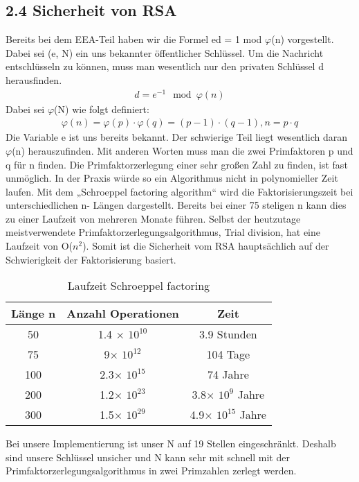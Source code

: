 \documentclass[course=asp]{aspdoc}
\begin{document}
\subsection*{2.4 Sicherheit von RSA}
Bereits bei dem EEA-Teil haben wir die Formel ed = 1 mod $\varphi $(n) vorgestellt.  Dabei sei (e, N) ein uns bekannter öffentlicher Schlüssel. Um die Nachricht entschlüsseln zu können, muss man wesentlich nur den privaten Schlüssel d herausfinden. 
\begin{align}
	d = e^{-1} \mod \varphi (n)
\end{align}
Dabei sei $\varphi $(N) wie folgt definiert:
\begin{align}
	\varphi (n) = \varphi (p)\cdot \varphi (q) = (p-1) \cdot (q-1), n = p \cdot q
\end{align}
Die Variable e ist uns bereits bekannt. Der schwierige Teil liegt wesentlich daran $\varphi $(n) herauszufinden. Mit anderen Worten muss man die zwei Primfaktoren p und q für n finden. Die Primfaktorzerlegung einer sehr großen Zahl zu finden, ist fast unmöglich. In der Praxis würde so ein Algorithmus nicht in polynomieller Zeit laufen. Mit dem „Schroeppel factoring algorithm“ wird die Faktorisierungszeit bei unterschiedlichen n- Längen dargestellt. Bereits bei einer 75 steligen n  kann dies zu einer Laufzeit von mehreren Monate führen. Selbst der heutzutage meistverwendete Primfaktorzerlegungsalgorithmus, Trial division, hat eine Laufzeit von O($n^{2}$). Somit ist die Sicherheit vom RSA hauptsächlich auf der Schwierigkeit der Faktorisierung basiert. \cite{AttacksOnRSA}

\begin{table}[H]
\centering
   \begin{tabular}{||c c c||} 
 \hline
 Länge n & Anzahl Operationen & Zeit  \\ [0.5ex] 
 \hline\hline
 50 & 1.4 $\times$ $10^{10}$  & 3.9 Stunden  \\ 
 \hline
 75 & 9$\times $ $10^{12}$  & 104 Tage  \\
 \hline
 100 & 2.3$\times $ $10^{15}$ & 74 Jahre  \\
 \hline
 200 & 1.2$\times $ $10^{23}$ & 3.8$\times $ $10^{9}$ Jahre\\
 \hline
 300 & 1.5$\times $ $10^{29}$ & 4.9$\times $ $10^{15}$ Jahre \\ [1ex] 
 \hline

\end{tabular}
    \caption{Laufzeit Schroeppel factoring}
\end{table}
Bei unsere Implementierung ist unser N auf 19 Stellen eingeschränkt. Deshalb sind unsere Schlüssel unsicher und N kann sehr mit schnell mit der Primfaktorzerlegungsalgorithmus in zwei Primzahlen zerlegt werden.
 
\end{document}
